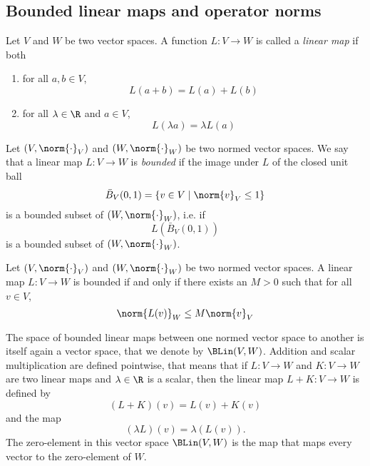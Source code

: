 \subsection{Bounded linear maps and operator norms}
\begin{definition}
    Let $V$ and $W$ be two vector spaces. A function $L: V \to W$ is called a \emph{linear map} if both
    \begin{enumerate}
        \item for all $a,b \in V$,
            $$L(a+b) = L(a) + L(b)$$

        \item for all $\lambda \in \R$ and $a \in V$,
            $$L(\lambda a) = \lambda L(a)$$
    \end{enumerate}
\end{definition}

\begin{definition}
    Let $(V, \norm{\cdot}_V)$ and $(W, \norm{\cdot}_W)$ be two normed vector spaces. We say that a linear map
    $L: V \to W$ is \emph{bounded} if the image under $L$ of the closed unit ball
    $$\bar{B}_V(0,1) = \{v \in V \mid \norm{v}_V \le 1\}$$
    is a bounded subset of $(W, \norm{\cdot}_W)$, i.e. if
    $$L(\bar{B}_V(0,1))$$
    is a bounded subset of $(W, \norm{\cdot}_W)$.
\end{definition}

\begin{proposition}
    Let $(V, \norm{\cdot}_V)$ and $(W, \norm{\cdot}_W)$ be two normed vector spaces. A linear map $L: V \to W$ is
    bounded if and only if there exists an $M > 0$ such that for all $v \in V$,
    $$\norm{L(v)}_W \le M\norm{v}_V$$
\end{proposition}

\begin{proposition}
    The space of bounded linear maps between one normed vector space to another is itself again a vector space, that 
    we denote by $\BLin(V,W)$. Addition and scalar multiplication are defined pointwise, that means that if $L: V \to W$
    and $K: V \to W$ are two linear maps and $\lambda \in \R$ is a scalar, then the linear map $L+K: V \to W$ is defined by
    $$(L+K)(v) = L(v) + K(v)$$
    and the map 
    $$(\lambda L)(v) = \lambda(L(v)).$$
    The zero-element in this vector space $\BLin(V,W)$ is the map that maps every vector to the zero-element of $W$.
\end{proposition}

